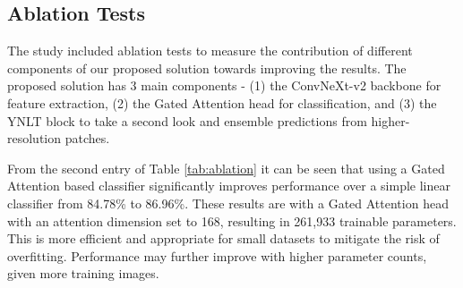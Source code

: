 \documentclass[final,3p,times,twocolumn]{elsarticle}
\begin{document}
\begin{table}[!ht]
    \caption{Ablation experiments to measure contribution of different components of the proposed solution to improving results on the lab and out-of-distribution test sets. The last row represents our proposed solution with both the novel components (Gated Attention and the YNLT block). All the model configurations use the same pretrained ConvNeXt-V2 backbone for feature extraction.}
    \label{tab:ablation}
    \renewcommand{\arraystretch}{1.4}
    \centering
\end{table}

\subsection{Ablation Tests}
The study included ablation tests to measure the contribution of different components of our proposed solution towards improving the results. The proposed solution has 3 main components - (1) the ConvNeXt-v2 backbone for feature extraction, (2) the Gated Attention head for classification, and (3) the YNLT block to take a second look and ensemble predictions from higher-resolution patches.

From the second entry of Table \ref{tab:ablation} it can be seen that using a Gated Attention based classifier significantly improves performance over a simple linear classifier from 84.78\% to 86.96\%. These results are with a Gated Attention head with an attention dimension set to 168, resulting in 261,933 trainable parameters. This is more efficient and appropriate for small datasets to mitigate the risk of overfitting. Performance may further improve with higher parameter counts, given more training images. 
\end{document}
